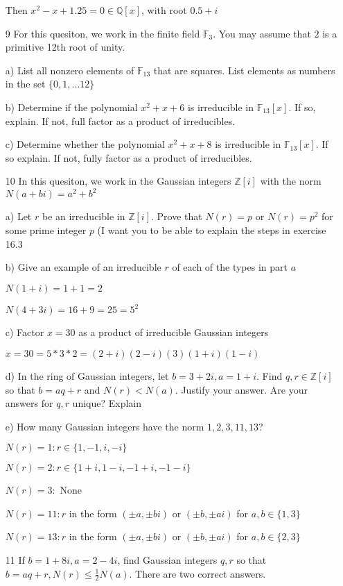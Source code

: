 \documentclass[12pt]{article}
\begin{document}
\begin{itemize}
		Then $x^2 - x + 1.25 = 0 \in \mathbb{Q}[x]$, with root $0.5 + i$ 

	\item[9] For this quesiton, we work in the finite field $\mathbb{F}_{3}$. You may assume that $2$ is a primitive 12th root of unity.

		a) List all nonzero elements of $\mathbb{F}_{13}$ that are squares. List elements as numbers in the set $\{0,1,...12\}$

		b) Determine if the polynomial $x^2 + x + 6$ is irreducible in $\mathbb{F}_{13}[x]$. If so, explain. If not, full factor as a product of irreducibles.

		c) Determine whether the polynomial $x^2 + x + 8$ is irreducible in $\mathbb{F}_{13}[x]$. If so explain. If not, fully factor as a product of irreducibles.

	\item[10] In this quesiton, we work in the Gaussian integers $\mathbb{Z}[i]$  with the norm $N(a+bi) = a^2 + b^2$

		a) Let $r$ be an irreducible in $\mathbb{Z}[i]$. Prove that $N(r) = p$ or $N(r) = p^2$ for some prime integer $p$ (I want you to be able to explain the steps in exercise 16.3

		b) Give an example of an irreducible $r$ of each of the types in part $a$

		$N(1+i) = 1 + 1 = 2$

		$N(4 + 3i) = 16 + 9 = 25 = 5^2$

		c) Factor $x = 30$ as a product of irreducible Gaussian integers

		$x = 30 = 5 * 3 * 2 = (2 + i)(2-i)(3)(1+i)(1-i)$

		d) In the ring of Gaussian integers, let $b = 3 + 2i, a = 1+ i$. Find $q,r \in \mathbb{Z}[i]$ so that $b = aq + r$ and $N(r) < N(a)$. Justify your answer. Are your answers for $q,r$ unique? Explain

		e) How many Gaussian integers have the norm $1,2,3,11,13$?

		$N(r) = 1: r \in \{1, -1, i, -i\}$

		$N(r) = 2: r \in \{1+i, 1-i, -1+i, -1 - i\}$

		$N(r) = 3:$ None

		$N(r) = 11: r$ in the form $(\pm a, \pm b i)$ or $(\pm b, \pm a i)$ for $a,b \in \{1, 3\}$

		$N(r) = 13: r$ in the form $(\pm a, \pm b i)$ or $(\pm b, \pm a i)$ for $a,b \in \{2, 3\}$

	\item[11] If $b = 1 + 8i, a = 2-4i$, find Gaussian integers $q,r$ so that $b = aq + r, N(r) \leq \frac{1}{2} N(a)$. There are two correct answers.


\end{itemize}
\end{document}
